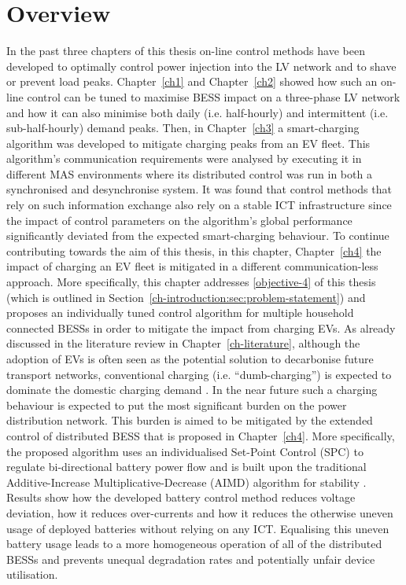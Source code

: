 \section{Overview}
\label{ch4:sec:overview}

In the past three chapters of this thesis on-line control methods have been developed to optimally control power injection into the LV network and to shave or prevent load peaks.
Chapter~\ref{ch1} and Chapter~\ref{ch2} showed how such an on-line control can be tuned to maximise BESS impact on a three-phase LV network and how it can also minimise both daily (i.e. half-hourly) and intermittent (i.e. sub-half-hourly) demand peaks.
Then, in Chapter~\ref{ch3} a smart-charging algorithm was developed to mitigate charging peaks from an EV fleet.
This algorithm's communication requirements were analysed by executing it in different MAS environments where its distributed control was run in both a synchronised and desynchronise system.
It was found that control methods that rely on such information exchange also rely on a stable ICT infrastructure since the impact of control parameters on the algorithm's global performance significantly deviated from the expected smart-charging behaviour.
To continue contributing towards the aim of this thesis, in this chapter, Chapter~\ref{ch4} the impact of charging an EV fleet is mitigated in a different communication-less approach.
More specifically, this chapter addresses \ref{objective-4} of this thesis (which is outlined in Section~\ref{ch-introduction:sec:problem-statement}) and proposes an individually tuned control algorithm for multiple household connected BESSs in order to mitigate the impact from charging EVs.
As already discussed in the literature review in Chapter~\ref{ch-literature}, although the adoption of EVs is often seen as the potential solution to decarbonise future transport networks, conventional charging (i.e. ``dumb-charging'') is expected to dominate the domestic charging demand \cite{Shah2015}.
In the near future such a charging behaviour is expected to put the most significant burden on the power distribution network.
This burden is aimed to be mitigated by the extended control of distributed BESS that is proposed in Chapter~\ref{ch4}.
More specifically, the proposed algorithm uses an individualised Set-Point Control (SPC) to regulate bi-directional battery power flow and is built upon the traditional Additive-Increase Multiplicative-Decrease (AIMD) algorithm for stability \cite{Chiu1989}.
Results show how the developed battery control method reduces voltage deviation, how it reduces over-currents and how it reduces the otherwise uneven usage of deployed batteries without relying on any ICT.
Equalising this uneven battery usage leads to a more homogeneous operation of all of the distributed BESSs and prevents unequal degradation rates and potentially unfair device utilisation.

